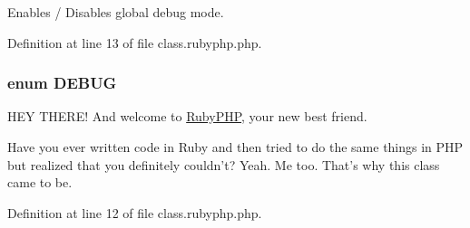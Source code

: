 Enables / Disables global debug mode. 



Definition at line 13 of file class.\-rubyphp.\-php.

\hypertarget{class_8rubyphp_8php_a73585d7121de037cf2e2ca12b27eb83e}{
\subsubsection[{D\-E\-B\-U\-G}]{\setlength{\rightskip}{0pt plus 5cm}enum {\bf D\-E\-B\-U\-G}}}\label{class_8rubyphp_8php_a73585d7121de037cf2e2ca12b27eb83e}
H\-E\-Y T\-H\-E\-R\-E! And welcome to \hyperlink{namespace_ruby_p_h_p}{Ruby\-P\-H\-P}, your new best friend.

Have you ever written code in Ruby and then tried to do the same things in P\-H\-P but realized that you definitely couldn't? Yeah. Me too. That's why this class came to be. 

Definition at line 12 of file class.\-rubyphp.\-php.

